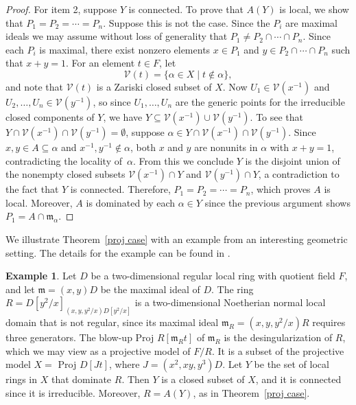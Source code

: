\documentclass[preprint, 11pt,nonatbib]{elsarticle}
\theoremstyle{definition}
\newtheorem{example}[theorem]{Example}
\numberwithin{theorem}{section}
\begin{document}
\begin{proof}
For item 2,   suppose $Y$ is connected. To prove that $A(Y)$ is local, we show that $P_1 = P_2 = \cdots = P_n$.
Suppose this is not the case. Since the $P_i$ are maximal ideals we may assume without loss of generality that $P_1 \ne P_2 \cap \cdots \cap P_n$.
Since each $P_i$ is maximal, there exist nonzero elements $x \in P_1$ and $y \in P_2 \cap \cdots \cap P_n$ such that $x + y = 1$.
For an element $t\in F$, let $${\mathcal{V}}(t) =\{ \alpha \in X \mid t \notin \alpha \},$$ and note that ${\mathcal{V}}(t)$ is a Zariski closed subset of $X$.
Now $U_1 \in {\mathcal{V}}(x^{-1})$ and $U_2,\ldots,U_n \in {\mathcal{V}}(y^{-1})$, so 
since $U_1,\ldots,U_n$ are the generic points for the irreducible closed components of ${Y}$, we have  ${Y} \subseteq {\mathcal{V}}(x^{-1}) \cup {{\mathcal{V}}}(y^{-1})$. 
To see that $Y \cap \mathcal{V} (x^{-1}) \cap \mathcal{V} (y^{-1}) = \emptyset$, suppose $\alpha \in {Y} \cap  {\mathcal{V}}(x^{-1}) \cap {\mathcal{V}}(y^{-1})$.
Since $x, y \in A \subseteq \alpha$ and $x^{-1}, y^{-1} \notin \alpha$, both $x$ and $y$ are nonunits in $\alpha$ with $x + y = 1$, contradicting the locality of~$\alpha$.
From this we conclude ${Y}$ is the disjoint union of the nonempty closed subsets $ {\mathcal{V}}(x^{-1}) \cap {Y}$ and ${\mathcal{V}}(y^{-1}) \cap {Y}$, a contradiction to the fact that  ${Y}$ is connected. Therefore, $P_1 = P_2 = \cdots = P_n$, which proves $A$ is local. Moreover, $A$ is dominated by each $\alpha \in {Y}$ since the previous argument shows  $P_1  = A 
\cap {\mathfrak{m}}_\alpha$.
\end{proof} 




We illustrate Theorem~\ref{proj case} with an example from an interesting  geometric setting. The details for the example can be found in \cite[Example~7.6]{MR4097907}.  

  
\begin{example} Let $D$ be a two-dimensional regular local ring with quotient field $F$, and let ${\mathfrak m} =(x,y)D$ be the maximal ideal of $D$.  The ring  $R = D[y^2/x]_{(x,y,y^2/x)D[y^2/x]}$ is a two-dimensional Noetherian normal local domain that is not regular, since its maximal ideal ${\mathfrak{m}}_R=(x,y,y^2/x)R$ requires three generators. The blow-up  Proj $R[{\mathfrak m}_Rt]$ of ${\mathfrak m}_R$ is the desingularization of $R$, which we may view as a  projective model of $F/R$. It is a subset of the  projective model $X= $ Proj $D[Jt]$, where $J = (x^2, xy, y^3)D$. Let $Y$ be the set of local rings in $X$ that dominate $R$. Then $Y$ is a closed subset of $X$, and it is connected since it is irreducible. 
Moreover, $R = A(Y)$, as in 
 Theorem~\ref{proj case}.
\end{example}
\end{document}
